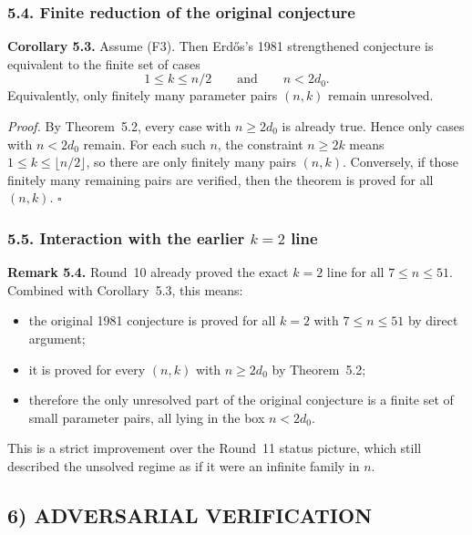 \subsubsection*{5.4. Finite reduction of the original conjecture}

\textbf{Corollary 5.3.}
Assume (F3). Then Erd\H{o}s's 1981 strengthened conjecture is equivalent to the finite set of cases
\[
1\le k\le n/2
\qquad\text{and}\qquad
n<2d_0.
\]
Equivalently, only finitely many parameter pairs $(n,k)$ remain unresolved.

\medskip
\textit{Proof.}
By Theorem~5.2, every case with $n\ge 2d_0$ is already true.
Hence only cases with $n<2d_0$ remain.
For each such $n$, the constraint $n\ge 2k$ means $1\le k\le \lfloor n/2\rfloor$, so there are only finitely many pairs $(n,k)$.
Conversely, if those finitely many remaining pairs are verified, then the theorem is proved for all $(n,k)$.
\hfill$\square$

\subsubsection*{5.5. Interaction with the earlier $k=2$ line}

\textbf{Remark 5.4.}
Round~10 already proved the exact $k=2$ line for all $7\le n\le 51$.
Combined with Corollary~5.3, this means:
\begin{itemize}
\item the original 1981 conjecture is proved for all $k=2$ with $7\le n\le 51$ by direct argument;
\item it is proved for every $(n,k)$ with $n\ge 2d_0$ by Theorem~5.2;
\item therefore the only unresolved part of the original conjecture is a finite set of small parameter pairs, all lying in the box $n<2d_0$.
\end{itemize}
This is a strict improvement over the Round~11 status picture, which still described the unsolved regime as if it were an infinite family in $n$.

\subsection*{6) ADVERSARIAL VERIFICATION}

